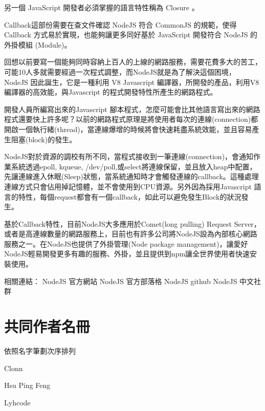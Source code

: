 \documentclass[a4paper,12pt,english]{sphinxmanual}
\begin{document}
另一個 JavaScript 開發者必須掌握的語言特性稱為 Closure 。

Callback這部份需要在查文件確認
NodeJS 符合 CommonJS 的規範，使得 Callback 方式易於實現，也能夠讓更多同好基於 JavaScript 開發符合 NodeJS 的外掛模組 (Module)。

回想以前要寫一個能夠同時容納上百人的上線的網路服務，需要花費多大的苦工，可能10人多就需要經過一次程式調整，而NodeJS就是為了解決這個困境， NodeJS 因此誕生，它是一種利用 V8 Javascript 編譯器，所開發的產品，利用V8 編譯器的高效能，與Javascript 的程式開發特性所產生的網路程式。

開發人員所編寫出來的Javascript 腳本程式，怎麼可能會比其他語言寫出來的網路程式還要快上許多呢？以前的網路程式原理是將使用者每次的連線(connection)都開啟一個執行緒(thread)，當連線爆增的時候將會快速耗盡系統效能，並且容易產生阻塞(block)的發生。

NodeJS對於資源的調校有所不同，當程式接收到一筆連線(connection)，會通知作業系統透過epoll, kqueue, /dev/poll,或select將連線保留，並且放入heap中配置，先讓連線進入休眠(Sleep)狀態，當系統通知時才會觸發連線的callback。這種處理連線方式只會佔用掉記憶體，並不會使用到CPU資源。另外因為採用Javascript 語言的特性，每個request都會有一個callback，如此可以避免發生Block的狀況發生。

基於Callback特性，目前NodeJS大多應用於Comet(long pulling) Request Server，或者是高連線數量的網路服務上，目前也有許多公司將NodeJS設為內部核心網路服務之一。在NodeJS也提供了外掛管理(Node package management)，讓愛好NodeJS輕易開發更多有趣的服務、外掛，並且提供到npm讓全世界使用者快速安裝使用。

相關連結：
NodeJS 官方網站
NodeJS 官方部落格
NodeJS github
NodeJS 中文社群


\chapter{共同作者名冊}
\label{AUTHOR::doc}\label{AUTHOR:id1}
依照名字筆劃次序排列

Clonn

Hsu Ping Feng

Lyhcode



\renewcommand{\indexname}{Index}
\printindex
\end{document}
